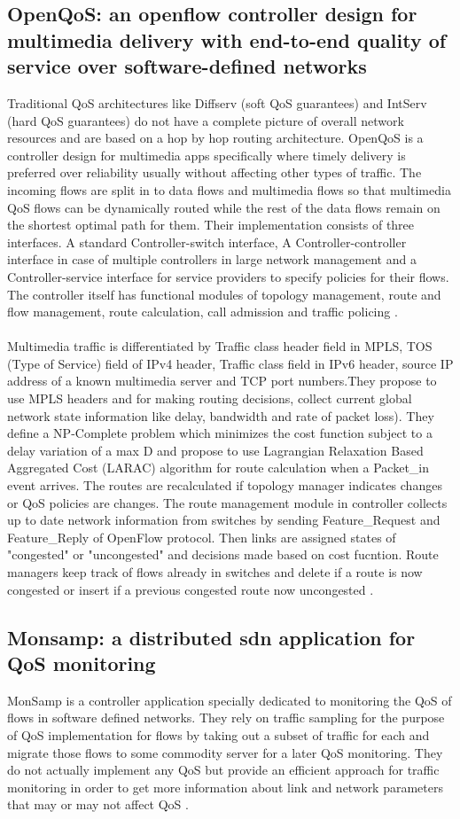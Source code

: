 \documentclass[paper=a4, fontsize=11pt]{scrartcl}	%
\numberwithin{equation}{section}		%
\numberwithin{figure}{section}			%
\numberwithin{table}{section}				%
\begin{document}
\subsection{OpenQoS: an openflow controller design for multimedia delivery with end-to-end quality of service over software-defined networks}
Traditional QoS architectures like Diffserv (soft QoS guarantees) and IntServ (hard QoS guarantees) do not have a complete picture of overall network resources and are based on a hop by hop routing architecture. OpenQoS is a controller design for multimedia apps specifically where timely delivery is preferred over reliability usually without affecting other types of traffic. The incoming flows are split in to data flows and multimedia flows so that multimedia QoS flows can be dynamically routed while the rest of the data flows remain on the shortest optimal path for them. Their implementation consists of three interfaces. A standard Controller-switch interface, A Controller-controller interface in case of multiple controllers in large network management and a  Controller-service interface for service providers to specify policies for their flows. The controller itself has functional modules of topology management, route and flow management, route calculation, call admission and traffic policing \cite{openqos}.
\\
\\
Multimedia traffic is differentiated by Traffic class header field in MPLS, TOS (Type of Service) field of IPv4 header, Traffic class field in IPv6 header, source IP address of a known multimedia server and TCP port numbers.They propose to use MPLS headers and for making routing decisions, collect current global network state information like delay, bandwidth and rate of packet loss). They define a NP-Complete problem which minimizes the cost function subject to a delay variation of a max D and propose to use Lagrangian Relaxation Based Aggregated Cost (LARAC) algorithm for route calculation when a Packet\_in event arrives. The routes are recalculated if topology manager indicates changes or QoS policies are changes. The route management module in controller collects up to date network information from switches by sending Feature\_Request and Feature\_Reply of OpenFlow protocol. Then links are assigned states of "congested" or "uncongested" and decisions made based on cost fucntion. Route managers keep track of flows already in switches and delete if a route is now congested or insert if a previous congested route now uncongested \cite{openqos}.
\subsection{Monsamp: a distributed sdn application for QoS monitoring}
MonSamp is a controller application specially dedicated to monitoring the QoS of flows in software defined networks. They rely on traffic sampling for the purpose of QoS implementation for flows by taking out a subset of traffic for each and migrate those flows to some commodity server for a later QoS monitoring. They do not actually implement any QoS but provide an efficient approach for traffic monitoring in order to get more information about link and network parameters that may or may not affect QoS \cite{monsamp}. 
\end{document}
